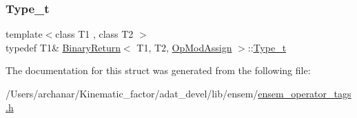 \mbox{\label{structBinaryReturn_3_01T1_00_01T2_00_01OpModAssign_01_4_ae184d3c020adc86d2a8e45d393ea778c}} 
\subsubsection{\texorpdfstring{Type\_t}{Type\_t}\hspace{0.1cm}{\footnotesize\ttfamily [2/2]}}
{\footnotesize\ttfamily template$<$class T1 , class T2 $>$ \\
typedef T1\& \mbox{\hyperlink{structBinaryReturn}{Binary\+Return}}$<$ T1, T2, \mbox{\hyperlink{structOpModAssign}{Op\+Mod\+Assign}} $>$\+::\mbox{\hyperlink{structBinaryReturn_3_01T1_00_01T2_00_01OpModAssign_01_4_ae184d3c020adc86d2a8e45d393ea778c}{Type\+\_\+t}}}



The documentation for this struct was generated from the following file\+:\begin{DoxyCompactItemize}
\item 
/\+Users/archanar/\+Kinematic\+\_\+factor/adat\+\_\+devel/lib/ensem/\mbox{\hyperlink{lib_2ensem_2ensem__operator__tags_8h}{ensem\+\_\+operator\+\_\+tags.\+h}}\end{DoxyCompactItemize}
